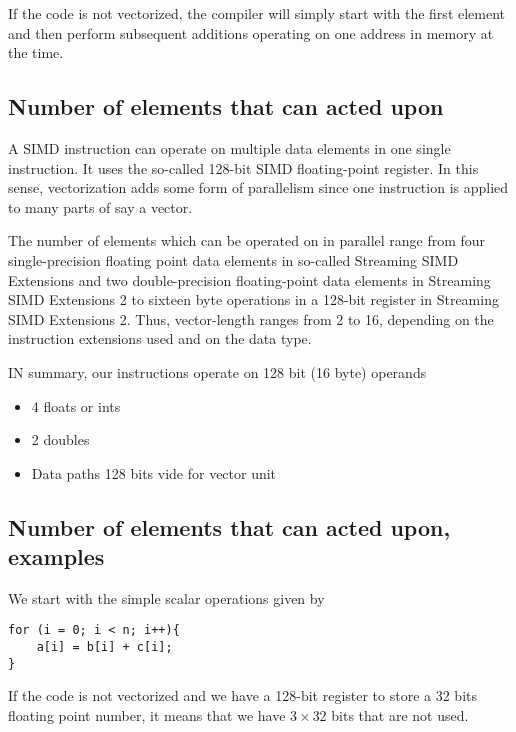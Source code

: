 \documentclass[%
oneside,                 %
final,                   %
10pt]{article}
\begin{document}
If the code is not vectorized, the compiler will simply start with the first element and 
then perform subsequent additions operating on one address in memory at the time. 

\subsection*{Number of elements that can acted upon}
A SIMD instruction can operate  on multiple data elements in one single instruction.
It uses the so-called 128-bit SIMD floating-point register. 
In this sense, vectorization adds some form of parallelism since one instruction is applied  
to many parts of say a vector.

The number of elements which can be operated on in parallel
range from four single-precision floating point data elements in so-called 
Streaming SIMD Extensions and two double-precision floating-point data
elements in Streaming SIMD Extensions 2 to sixteen byte operations in
a 128-bit register in Streaming SIMD Extensions 2. Thus, vector-length
ranges from 2 to 16, depending on the instruction extensions used and
on the data type. 

IN summary, our instructions  operate on 128 bit (16 byte) operands
\begin{itemize}
\item 4 floats or ints

\item 2 doubles

\item Data paths 128 bits vide for vector unit
\end{itemize}

\noindent
\subsection*{Number of elements that can acted upon, examples}
We start with the simple scalar operations given by




\begin{verbatim}
for (i = 0; i < n; i++){
    a[i] = b[i] + c[i];
}

\end{verbatim}

If the code is not vectorized  and we have a 128-bit register to store a 32 bits floating point number,
it means that we have $3\times 32$ bits that are not used. 
\end{document}
